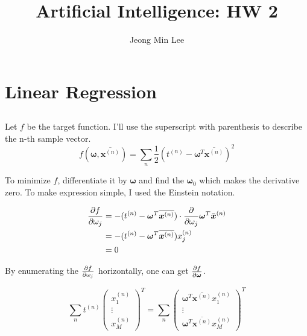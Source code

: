 \documentclass[12pt]{article}
\title{\textbf{Artificial Intelligence: HW 2}}
\author{Jeong Min Lee}
\begin{document}
\maketitle

\section{Linear Regression}
\subsection{}
Let $f$ be the target function. I'll use the superscript with parenthesis to describe the n-th sample vector.
\begin{equation}
    f(\boldsymbol{\omega},\overline{\boldsymbol{x}^{(n)}}) = \sum_n\frac{1}{2}\left(t^{(n)} - \boldsymbol{\omega}^T \overline{\boldsymbol{x}^{(n)}}\right)^2
\end{equation}

To minimize $f$, differentiate it by $\boldsymbol{\omega}$ and find the $\boldsymbol{\omega}_0$ which makes the derivative zero. To make expression simple, I used the Einstein notation. 

\begin{align*}
    {\partial f \over \partial \omega_j} &= -(t^{(n)} - \boldsymbol{\omega}^T \overline{\boldsymbol{x}^{(n)}}) \cdot {\partial \over \partial \omega_j} \boldsymbol{\omega}^T \bar{\boldsymbol{x}}^{(n)} \\
    &= -(t^{(n)} - \boldsymbol{\omega}^T \overline{\boldsymbol{x}^{(n)}}) x_j^{(n)}\\
    &=0
\end{align*}

By enumerating the ${\partial f \over \partial \omega_j}$ horizontally, one can get ${\partial f \over \partial \boldsymbol{\omega}}$.

\begin{equation}
    \sum_n t^{(n)}\begin{pmatrix} x^{(n)}_1 \\ \vdots \\ x^{(n)}_M \end{pmatrix}^T = \sum_n \begin{pmatrix} \boldsymbol{\omega}^T \overline{\boldsymbol{x}^{(n)}}x_1^{(n)} \\ \vdots \\ \boldsymbol{\omega}^T \overline{\boldsymbol{x}^{(n)}}x_M^{(n)} \end{pmatrix}^T
\end{equation}
\end{document}
